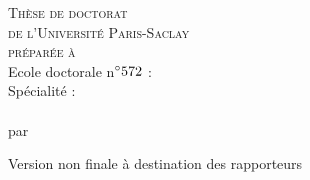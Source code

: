 \vspace*{1cm}
\color{blue!20!red!45!black} %
  \begin{center}    
    \LARGE\textsc{Thèse de doctorat\\ de l'Université Paris-Saclay} \\
    \LARGE{\textsc{préparée à \PhDworkingplace}} \\ \bigskip
  \color{black} %
	\bigskip  
    \Large{Ecole doctorale n$^{\circ}572$ :} %
     \Large{\ecodoctitle}  \\

     \Large{Spécialité : \PhDspeciality} \\%
    \vfill
    \LARGE{\textbf{\textsc{\PhDTitleFR}}} \\ %
    \bigskip
		\bigskip
		   \Large{par}\\
   \bigskip
	\bigskip
   \LARGE{\textbf{\textsc{\PhDname}}} %

    \vfill
    \bigskip
\end{center}
\color{black}
\begin{flushleft}
\bigskip
Version non finale à destination des rapporteurs
\bigskip
\end{flushleft}
%
%
